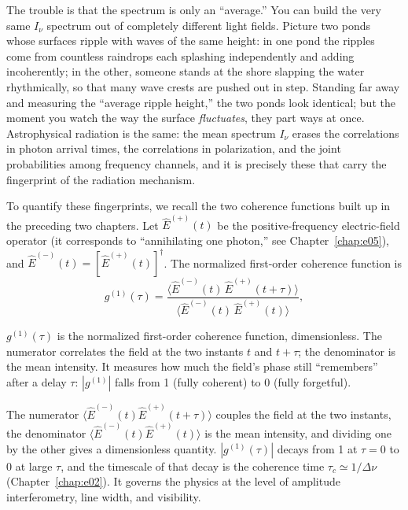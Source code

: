 The trouble is that the spectrum is only an ``average.'' You can build the very same \(I_\nu\) spectrum out of completely different light fields. Picture two ponds whose surfaces ripple with waves of the same height: in one pond the ripples come from countless raindrops each splashing independently and adding incoherently; in the other, someone stands at the shore slapping the water rhythmically, so that many wave crests are pushed out in step. Standing far away and measuring the ``average ripple height,'' the two ponds look identical; but the moment you watch the way the surface \emph{fluctuates}, they part ways at once. Astrophysical radiation is the same: the mean spectrum \(I_\nu\) erases the correlations in photon arrival times, the correlations in polarization, and the joint probabilities among frequency channels, and it is precisely these that carry the fingerprint of the radiation mechanism.

To quantify these fingerprints, we recall the two coherence functions built up in the preceding two chapters. Let \(\hat E^{(+)}(t)\) be the positive-frequency electric-field operator (it corresponds to ``annihilating one photon,'' see Chapter~\ref{chap:e05}), and \(\hat E^{(-)}(t)=[\hat E^{(+)}(t)]^\dagger\). The normalized first-order coherence function is
\begin{equation}
  g^{(1)}(\tau)=
  \frac{\langle \hat E^{(-)}(t)\,\hat E^{(+)}(t+\tau)\rangle}
       {\langle \hat E^{(-)}(t)\,\hat E^{(+)}(t)\rangle},
  \label{eq:e16-g1}
\end{equation}
\begin{formulaexplain}
\(g^{(1)}(\tau)\) is the normalized first-order coherence function, dimensionless. The numerator correlates the field at the two instants \(t\) and \(t+\tau\); the denominator is the mean intensity. It measures how much the field's phase still ``remembers'' after a delay \(\tau\): \(|g^{(1)}|\) falls from 1 (fully coherent) to 0 (fully forgetful).
\end{formulaexplain}
The numerator \(\langle \hat E^{(-)}(t)\hat E^{(+)}(t+\tau)\rangle\) couples the field at the two instants, the denominator \(\langle \hat E^{(-)}(t)\hat E^{(+)}(t)\rangle\) is the mean intensity, and dividing one by the other gives a dimensionless quantity. \(|g^{(1)}(\tau)|\) decays from 1 at \(\tau=0\) to 0 at large \(\tau\), and the timescale of that decay is the coherence time \(\tau_c\simeq1/\Delta\nu\) (Chapter~\ref{chap:e02}). It governs the physics at the level of amplitude interferometry, line width, and visibility.

